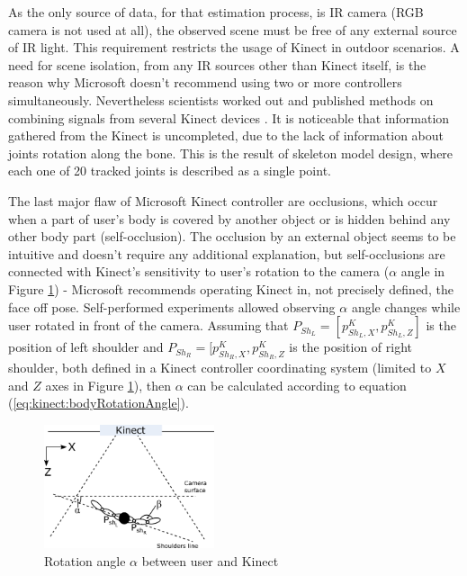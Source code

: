 \documentclass[sensors,article,submit,moreauthors,pdftex,10pt,a4paper]{mdpi}
\begin{document}
As the only source of data, for that estimation process, is IR camera (RGB camera is not used at all), the observed scene must be free of any external source of IR light. This requirement restricts the usage of Kinect in outdoor scenarios. A need for scene isolation, from any IR sources other than Kinect itself, is the reason why Microsoft doesn't recommend using two or more controllers simultaneously. Nevertheless scientists worked out and published methods on combining signals from several Kinect devices \cite{Asteriadis2013,Kitsikidis2011,Schroder2011}. It is noticeable that information gathered from the Kinect is uncompleted, due to the lack of information about joints rotation along the bone. This is the result of skeleton model design, where each one of 20 tracked joints is described as a single point.

The last major flaw of Microsoft Kinect controller are occlusions, which occur when a part of user’s body is covered by another object or is hidden behind any other body part (self-occlusion). The occlusion by an external object seems to be intuitive and doesn't require any additional explanation, but self-occlusions are connected with Kinect’s sensitivity to user’s rotation to the camera ($\alpha$ angle in Figure \ref{fig:kinect:rotationAngle}) - Microsoft recommends operating Kinect in, not precisely defined, the face off pose. Self-performed experiments allowed observing $\alpha$ angle changes while user rotated in front of the camera. Assuming that $P_{Sh_L} = [p^K_{{Sh}_L,X} , p^K_{{Sh}_L,Z}]$ is the position of left shoulder and $P_{Sh_R} = [p^K_{{Sh}_R,X} , p^K_{{Sh}_R,Z}$ is the position of right shoulder, both defined in a Kinect controller coordinating system (limited to $X$ and $Z$ axes in Figure \ref{fig:kinect:rotationAngle}), then $\alpha$ can be calculated according to equation (\ref{eq:kinect:bodyRotationAngle}).

\begin{figure}[H]
	\centering
	\includegraphics[width=5cm]{Figure3.png}
	\caption{Rotation angle $\alpha$ between user and Kinect}
	\label{fig:kinect:rotationAngle}
\end{figure}
\end{document}
